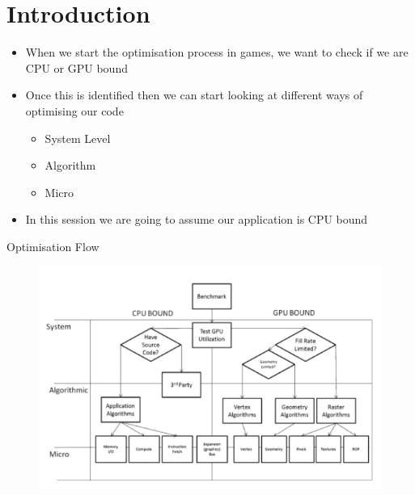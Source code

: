 \part{Introduction}
\frame{\partpage}

\begin{frame}
	\begin{itemize}
		\pause \item When we start the optimisation process in games, we want to check if we are CPU or GPU bound
		\pause \item Once this is identified then we can start looking at different ways of optimising our code
		\begin{itemize}
			\pause \item System Level
			\pause \item Algorithm
			\pause \item Micro 
		\end{itemize}
		\pause \item In this session we are going to assume our application is CPU bound 
	\end{itemize}
\end{frame}

\begin{frame}{Optimisation Flow}
	\begin{figure}
		\includegraphics[width=1.0\textwidth,height=0.8\textheight]{OptimisationFlowChart}  
	\end{figure}
\end{frame}